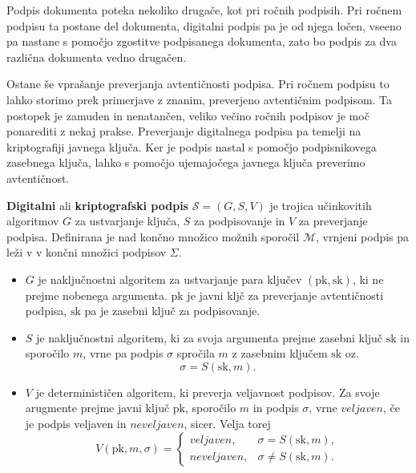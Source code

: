\documentclass[isrm2, tisk]{fmfdelo}
\begin{document}
Podpis dokumenta poteka nekoliko drugače, kot pri ročnih podpisih. Pri ročnem podpisu ta postane del 
dokumenta, digitalni podpis pa je od njega ločen, vseeno pa nastane s pomočjo zgostitve podpisanega 
dokumenta, zato bo podpis za dva različna dokumenta vedno drugačen.

Ostane še vprašanje preverjanja avtentičnosti podpisa. Pri ročnem podpisu to lahko storimo prek 
primerjave z znanim, preverjeno avtentičnim podpisom. Ta postopek je zamuden in nenatančen, veliko 
večino ročnih podpisov je moč ponarediti z nekaj prakse. Preverjanje digitalnega podpisa pa temelji 
na kriptografiji javnega ključa. Ker je podpis nastal s pomočjo podpisnikovega zasebnega ključa,
lahko s pomočjo ujemajočega javnega ključa preverimo avtentičnost.

\begin{definicija}
    \textbf{Digitalni} ali \textbf{kriptografski podpis} $\mathcal{S} = (G, S, V)$ je trojica 
    učinkovitih algoritmov $G$ za ustvarjanje ključa, $S$ za podpisovanje in $V$ za preverjanje 
    podpisa. Definirana je nad končno množico možnih sporočil $\mathcal{M}$, vrnjeni podpis pa 
    leži v v končni množici podpisov $\Sigma$.
    \begin{itemize}
        \item $G$ je naključnostni algoritem za ustvarjanje para ključev $(\text{pk}, \text{sk})$, 
            ki ne prejme nobenega argumenta. $\text{pk}$ je javni kljč za preverjanje avtentičnosti 
            podpisa, $\text{sk}$ pa je zasebni ključ za podpisovanje. 
        \item $S$ je naključnostni algoritem, ki za svoja argumenta prejme zasebni ključ $\text{sk}$ 
            in sporočilo $m$, vrne pa podpis $\sigma$ spročila $m$ z zasebnim ključem $\text{sk}$ 
            oz.\ 
            $$ 
            \sigma = S(\text{sk}, m).
            $$
        \item $V$ je determinističen algoritem, ki preverja veljavnost podpisov. Za svoje arugmente 
            prejme javni ključ $\text{pk}$, sporočilo $m$ in podpis $\sigma$, vrne $veljaven$, če je podpis 
            veljaven in $neveljaven$, sicer. Velja torej
            $$ 
            V(\text{pk}, m, \sigma) = 
            \begin{cases}
                veljaven, & \sigma = S(\text{sk}, m), \\
                neveljaven, & \sigma \neq S(\text{sk}, m).
            \end{cases}
            $$
    \end{itemize}
\end{definicija}
\end{document}
